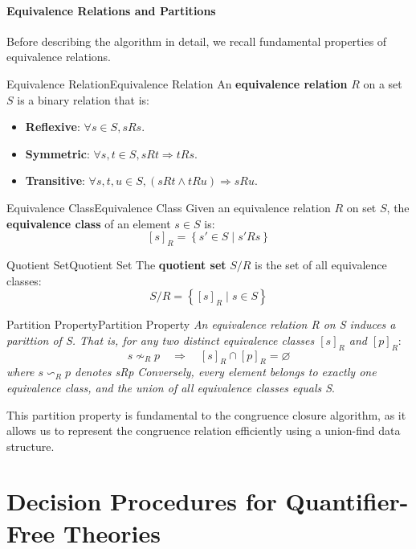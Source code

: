 \documentclass[a4paper]{article}
\theoremstyle{definition}
\begin{document}
\subsection{Equivalence Relations and Partitions}
Before describing the algorithm in detail, we recall fundamental properties of equivalence relations.
\begin{definition}{Equivalence Relation}{Equivalence Relation}
An \textbf{equivalence relation} \( R \) on a set \( S \) is a binary relation that is:
\begin{itemize}
	\item \textbf{Reflexive}: \( \forall s \in S, sRs \).
	\item \textbf{Symmetric}: \( \forall s,t \in S, sRt \Rightarrow tRs \).
	\item \textbf{Transitive}: \( \forall s,t,u \in S, (sRt \wedge tRu) \Rightarrow sRu \).
\end{itemize}
\end{definition}
\begin{definition}{Equivalence Class}{Equivalence Class}
Given an equivalence relation \( R \) on set \( S \), the \textbf{equivalence class} of an element \( s \in S \) is:
\[
  [s]_R = \left\{s' \in S \;|\; s'Rs \right\}
\]
\end{definition}
\begin{definition}{Quotient Set}{Quotient Set}
The \textbf{quotient set} \( S/R \) is the set of all equivalence classes:
\[
  S/R = \left\{ [s]_R \;|\; s \in S \right\}
\]
\end{definition}
\begin{definition}{Partition Property}{Partition Property}
\textit{An equivalence relation R on S induces a parittion of S. That is, for any two distinct equivalence classes 
\( [s]_R \) and  \( [p]_R \)}:
\[
  s\nsim_R p \quad \Rightarrow \quad [s]_R \cap [p]_R = \varnothing
\]
\textit{where \( s \backsim_R p \) denotes sRp}
\vspace{1em}
\noindent
\newline
\textit{Conversely, every element belongs to exactly one equivalence class, and the union of all equivalence classes equals S}.
\end{definition}
This partition property is fundamental to the congruence closure algorithm, as it allows us to represent the congruence relation efficiently using 
a union-find data structure.
\part{Decision Procedures for Quantifier-Free Theories}
\end{document}
